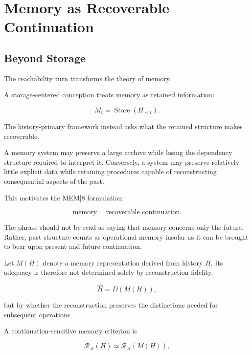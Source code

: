 \documentclass[11pt]{article}
\theoremstyle{remark}
\newcommand{\MEM}{\textsc{MEM|8}}
\newcommand{\Adm}{\mathcal{A}}
\newcommand{\Reach}{\mathcal{R}}
\begin{document}
\section{Memory as Recoverable Continuation}

\subsection{Beyond Storage}

The reachability turn transforms the theory of memory.

A storage-centered conception treats memory as retained information:

\begin{equation}
M_t
=
\operatorname{Store}(H_{<t}).
\end{equation}

The history-primary framework instead asks what the retained structure makes recoverable.

A memory system may preserve a large archive while losing the dependency structure required to interpret it. Conversely, a system may preserve relatively little explicit data while retaining procedures capable of reconstructing consequential aspects of the past.

This motivates the \MEM{} formulation:

\begin{equation}
\boxed{
\text{memory}
=
\text{recoverable continuation}.
}
\end{equation}

The phrase should not be read as saying that memory concerns only the future. Rather, past structure counts as operational memory insofar as it can be brought to bear upon present and future continuation.

Let $M(H)$ denote a memory representation derived from history $H$. Its adequacy is therefore not determined solely by reconstruction fidelity,

\begin{equation}
\hat{H}
=
D(M(H)),
\end{equation}

but by whether the reconstruction preserves the distinctions needed for subsequent operations.

A continuation-sensitive memory criterion is

\begin{equation}
\Reach_{\Adm}(H)
\simeq
\Reach_{\Adm}(M(H)),
\end{equation}
\end{document}
